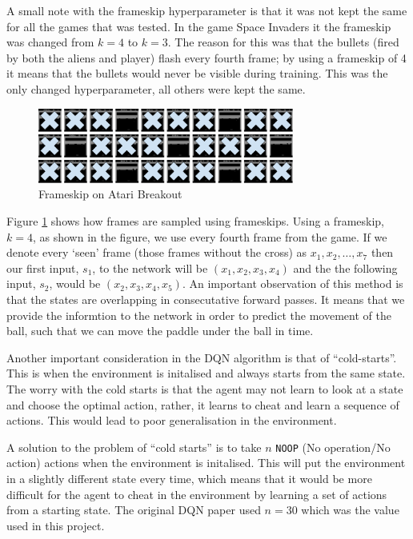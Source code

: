 A small note with the frameskip hyperparameter is that it was not kept the same for all the games that was tested. In the game Space Invaders it the frameskip was changed from $k = 4$ to $k = 3$. The reason for this was that the bullets (fired by both the aliens and player) flash every fourth frame; by using a frameskip of 4 it means that the bullets would never be visible during training. This was the only changed hyperparameter, all others were kept the same.

\begin{figure}[htbp]
  \centering
  \includegraphics[width=0.75\textwidth]{chapters/chapter4/images/frameskip.png}
  \caption{Frameskip on Atari Breakout
    \label{fig:frameskip}
  }
\end{figure}

Figure \ref{fig:frameskip} shows how frames are sampled using frameskips. Using a frameskip, $k = 4$, as shown in the figure, we use every fourth frame from the game. If we denote every `seen' frame (those frames without the cross) as $x_1, x_2, \hdots, x_7$ then our first input, $s_1$, to the network will be $(x_1, x_2, x_3, x_4)$ and the the following input, $s_2$, would be $(x_2, x_3, x_4, x_5)$. An important observation of this method is that the states are overlapping in consecutative forward passes. It means that we provide the informtion to the network in order to predict the movement of the ball, such that we can move the paddle under the ball in time.

Another important consideration in the DQN algorithm is that of ``cold-starts''. This is when the environment is initalised and always starts from the same state. The worry with the cold starts is that the agent may not learn to look at a state and choose the optimal action, rather, it learns to cheat and learn a sequence of actions. This would lead to poor generalisation in the environment.

A solution to the problem of ``cold starts'' is to take $n$ \texttt{NOOP} (No operation/No action) actions when the environment is initalised. This will put the environment in a slightly different state every time, which means that it would be more difficult for the agent to cheat in the environment by learning a set of actions from a starting state. The original DQN paper \cite{dqn} used $n = 30$ which was the value used in this project.

